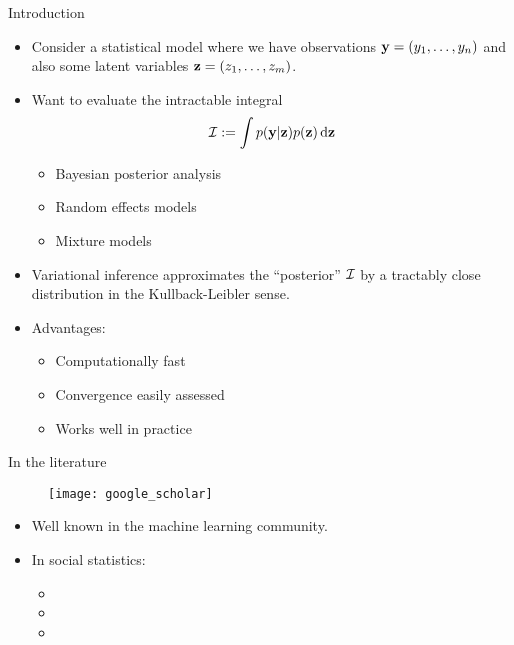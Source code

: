 \begin{frame}{Introduction}
  \begin{itemize}
    \item Consider a statistical model where we have observations ${\mathbf y} = (y_1, \dots, y_n)$ and also some latent variables ${\mathbf z} = (z_1, \dots, z_m)$.
    \pause  
    \item Want to evaluate the intractable integral
    \[
      {\mathcal I} := \int p({\mathbf y}|{\mathbf z})p({\mathbf z}) \, \text{d}{\mathbf z}
    \]
    \begin{itemize}
      \item Bayesian posterior analysis
      \item Random effects models 
      \item Mixture models
    \end{itemize}
    \pause
    \item Variational inference approximates the ``posterior'' ${\mathcal I}$ by a tractably close distribution in the Kullback-Leibler sense.
    \item<4-> Advantages:
    \begin{itemize}
      \item Computationally fast
      \item Convergence easily assessed
      \item Works well in practice
    \end{itemize}
  \end{itemize}
\end{frame}

\begin{frame}{In the literature}
  \vspace{-15pt}
  \begin{figure}[h]
    \texttt{[image: google\_scholar]}
  \end{figure}
  \vspace{-15pt}
  \begin{itemize}
    \item Well known in the machine learning community.
    \pause
    \item In social statistics:
    \begin{itemize}\footnotesize
      \item {}
      \item {}
      \item {}
    \end{itemize}
  \end{itemize}
\end{frame}

